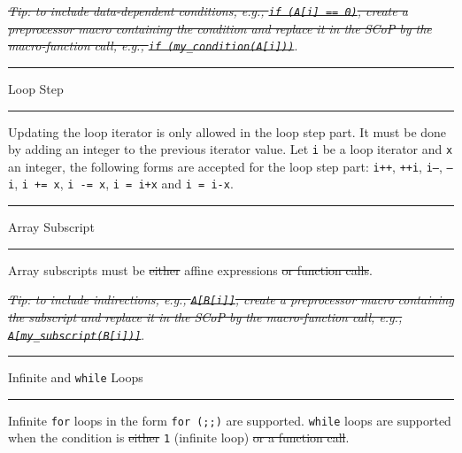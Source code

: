 \documentclass[landscape,a4paper]{article}
\def\titre#1{\begin{center}\hrule\vspace{0.1cm}#1
\vspace{0.07cm}\hrule\end{center}}
\begin{document}
\begin{multicols}{3}
\begin{small}
\vspace{0.3cm}
\textit{\sout{Tip: to include data-dependent conditions, e.g.,
{\tt if (A[i] == 0)}, create a preprocessor macro containing
the condition and replace it in the SCoP by the macro-function call,
e.g., {\tt if (my\_condition(A[i]))}}}.
\end{small}

\titre{Loop Step}

\begin{small}
Updating the loop iterator is only allowed in the loop step part.
It must be done by adding an integer to the previous
iterator value. Let {\tt i} be a loop iterator and {\tt x} an integer,
the following forms are accepted for the loop step part:
{\tt i++}, {\tt ++i}, {\tt i---}, {\tt ---i}, {\tt i += x}, {\tt i -= x}, {\tt i = i+x} and
{\tt i = i-x}.
\end{small}

\titre{Array Subscript}

\begin{small}
Array subscripts must be \sout{either} affine expressions \sout{or function calls}.

\vspace{0.3cm}
\textit{\sout{Tip: to include indirections, e.g., {\tt A[B[i]]}, create a
preprocessor macro containing the subscript and replace it in the SCoP by
the macro-function call, e.g., {\tt A[my\_subscript(B[i])]}}}.
\end{small}

\titre{Infinite and {\tt while} Loops}

\begin{small}
Infinite {\tt for} loops in the form {\tt for (;;)} are supported.
{\tt while} loops are supported when the condition is \sout{either} {\tt 1}
(infinite loop) \sout{or a function call}.
\end{small}

\end{multicols}
\end{document}
